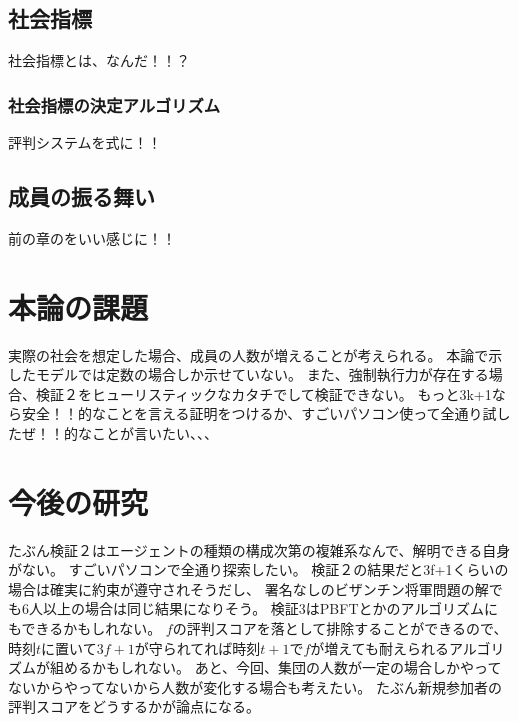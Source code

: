 \subsection{社会指標}
社会指標とは、なんだ！！？

\subsubsection{社会指標の決定アルゴリズム}
評判システムを式に！！

\subsection{成員の振る舞い}
前の章のをいい感じに！！

\section{本論の課題}
実際の社会を想定した場合、成員の人数が増えることが考えられる。
本論で示したモデルでは定数の場合しか示せていない。
また、強制執行力が存在する場合、検証２をヒューリスティックなカタチでして検証できない。
もっと3k+1なら安全！！的なことを言える証明をつけるか、すごいパソコン使って全通り試したぜ！！的なことが言いたい、、、

\section{今後の研究}
たぶん検証２はエージェントの種類の構成次第の複雑系なんで、解明できる自身がない。
すごいパソコンで全通り探索したい。
検証２の結果だと3f+1くらいの場合は確実に約束が遵守されそうだし、
署名なしのビザンチン将軍問題の解でも6人以上の場合は同じ結果になりそう。
検証3はPBFTとかのアルゴリズムにもできるかもしれない。
$f$の評判スコアを落として排除することができるので、
時刻$t$に置いて$3f+1$が守られてれば時刻$t+1$で$f$が増えても耐えられるアルゴリズムが組めるかもしれない。
あと、今回、集団の人数が一定の場合しかやってないからやってないから人数が変化する場合も考えたい。
たぶん新規参加者の評判スコアをどうするかが論点になる。